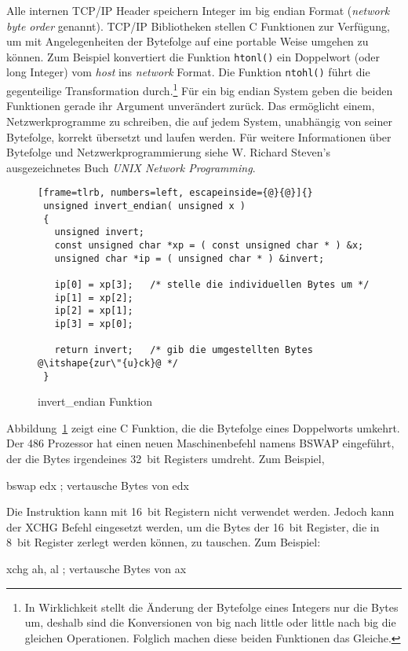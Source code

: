 Alle internen TCP/IP Header speichern Integer im big endian Format
(\emph{network byte order} genannt). TCP/IP 
Bibliotheken stellen C Funktionen zur Ver\-f\"{u}\-gung, um mit
Angelegenheiten der Bytefolge auf eine portable Weise umgehen zu
k\"{o}nnen. Zum Beispiel konvertiert die Funktion \lstinline|htonl()|
 ein Doppelwort (oder long Integer) vom \emph{host}
ins \emph{network} Format. Die Funktion \lstinline|ntohl()|
 f\"{u}hrt die gegenteilige Transformation
durch.\footnote{In Wirklichkeit stellt die \"{A}nderung der Bytefolge
eines Integers nur die Bytes um, deshalb sind die Konversionen von
big nach little oder little nach big die gleichen Operationen.
Folglich machen diese beiden Funktionen das Gleiche.} F\"{u}r ein big
endian System geben die beiden Funktionen gerade ihr Argument
unver\"{a}ndert zur\"{u}ck. Das erm\"{o}glicht einem, Netzwerkprogramme zu
schreiben, die auf jedem System, unabh\"{a}ngig von seiner Bytefolge,
korrekt \"{u}bersetzt und laufen werden. F\"{u}r weitere Informationen \"{u}ber
Bytefolge und Netzwerkprogrammierung siehe W. Richard Steven's
ausgezeichnetes Buch \emph{UNIX Network Programming}.

\begin{figure}[ht]
\begin{lstlisting}[frame=tlrb, numbers=left, escapeinside={@}{@}]{}
 unsigned invert_endian( unsigned x )
 {
   unsigned invert;
   const unsigned char *xp = ( const unsigned char * ) &x;
   unsigned char *ip = ( unsigned char * ) &invert;

   ip[0] = xp[3];   /* stelle die individuellen Bytes um */
   ip[1] = xp[2];
   ip[2] = xp[1];
   ip[3] = xp[0];

   return invert;   /* gib die umgestellten Bytes @\itshape{zur\"{u}ck}@ */
 }
\end{lstlisting}
\caption{invert\_endian Funktion \label{fig:invertEndian}
}
\end{figure}

Abbildung~\ref{fig:invertEndian} zeigt eine C Funktion, die die
Bytefolge eines Doppelworts umkehrt. Der 486 Prozessor hat einen
neuen Maschinenbefehl namens {\code BSWAP}
 eingef\"{u}hrt, der die Bytes irgendeines
32~bit Registers umdreht. Zum Beispiel,
\begin{AsmCodeListing}[frame=none, numbers=left]
      bswap   edx             ; vertausche Bytes von edx
\end{AsmCodeListing}
Die Instruktion kann mit 16~bit Registern nicht verwendet werden.
Jedoch kann der {\code XCHG}  Befehl
eingesetzt werden, um die Bytes der 16~bit Register, die in 8~bit
Register zerlegt werden k\"{o}nnen, zu tauschen. Zum Beispiel:
\begin{AsmCodeListing}[frame=none, numbers=left, firstnumber=last]
      xchg    ah, al          ; vertausche Bytes von ax
\end{AsmCodeListing}

